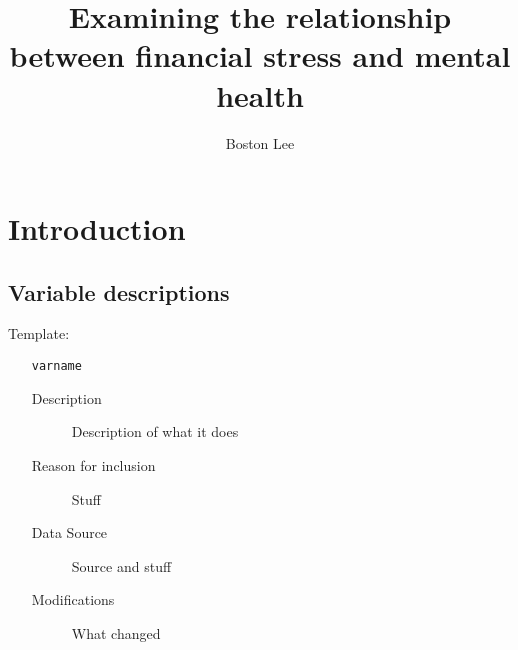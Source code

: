 \documentclass{article}
\title{Examining the relationship between financial stress and mental health}
\author{Boston Lee}
\begin{document}
\maketitle

\section{Introduction}

\subsection{Variable descriptions}

Template:

\begin{itemize}
    \item[\texttt{varname}]
          \begin{description}
              \item[Description] Description of what it does
              \item[Reason for inclusion] Stuff
              \item[Data Source] Source and stuff
              \item[Modifications] What changed
          \end{description}
\end{itemize}
\end{document}
